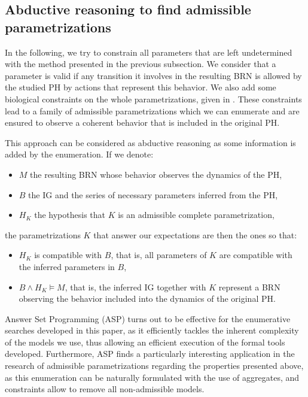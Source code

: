 \subsection{Abductive reasoning to find admissible parametrizations}\label{ssec:admissible-K}

In the following, we try to constrain all parameters that are left undetermined with the method presented in the previous subsection.
We consider that a parameter is valid if any transition it involves in the resulting BRN is allowed by the studied PH by actions that represent this behavior.
We also add some biological constraints on the whole parametrizations, given in \cite{BernotSemBRN}.
These constraints lead to a family of admissible parametrizations which we can enumerate and are ensured to observe a coherent behavior that is included in the original PH.

This approach can be considered as abductive reasoning as some information is added by the enumeration.
If we denote:
\begin{itemize}
  \item $M$ the resulting BRN whose behavior observes the dynamics of the PH,
  \item $B$ the IG and the series of necessary parameters inferred from the PH,
  \item $H_K$ the hypothesis that $K$ is an admissible complete parametrization,
\end{itemize}
the parametrizations $K$ that answer our expectations are then the ones so that:
\begin{itemize}
  \item $H_K$ is compatible with $B$, that is, all parameters of $K$ are compatible with the inferred parameters in $B$,
  \item $B \wedge H_K \models M$, that is, the inferred IG together with $K$ represent a BRN observing the behavior included into the dynamics of the original PH.
\end{itemize}

Answer Set Programming (ASP) \cite{Baral03} turns out to be effective for the enumerative searches developed in this paper,
as it efficiently tackles the inherent complexity of the models we use, thus allowing an efficient execution of the formal tools developed.
Furthermore, ASP finds a particularly interesting application in the research of admissible parametrizations regarding the properties presented above, as this enumeration can be naturally formulated with the use of aggregates, and constraints allow to remove all non-admissible models.
